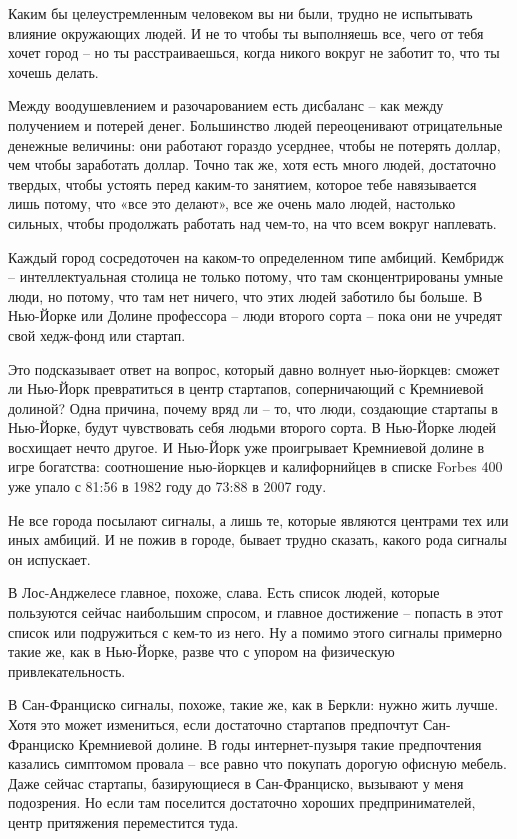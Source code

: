 \documentclass[ebook,12pt,oneside,openany]{memoir}
\begin{document}
Каким бы целеустремленным человеком вы ни были, трудно не испытывать
влияние окружающих людей. И не то чтобы ты выполняешь все, чего от
тебя хочет город – но ты расстраиваешься, когда никого вокруг не
заботит то, что ты хочешь делать.

Между воодушевлением и разочарованием есть дисбаланс – как между
получением и потерей денег. Большинство людей переоценивают
отрицательные денежные величины: они работают гораздо усерднее, чтобы
не потерять доллар, чем чтобы заработать доллар. Точно так же, хотя
есть много людей, достаточно твердых, чтобы устоять перед каким-то
занятием, которое тебе навязывается лишь потому, что «все это делают»,
все же очень мало людей, настолько сильных, чтобы продолжать работать
над чем-то, на что всем вокруг наплевать.

Каждый город сосредоточен на каком-то определенном типе амбиций.
Кембридж – интеллектуальная столица не только потому, что там
сконцентрированы умные люди, но потому, что там нет ничего, что этих
людей заботило бы больше. В Нью-Йорке или Долине профессора – люди
второго сорта – пока они не учредят свой хедж-фонд или стартап.

Это подсказывает ответ на вопрос, который давно волнует нью-йоркцев:
сможет ли Нью-Йорк превратиться в центр стартапов, соперничающий с
Кремниевой долиной? Одна причина, почему вряд ли – то, что люди,
создающие стартапы в Нью-Йорке, будут чувствовать себя людьми второго
сорта. В Нью-Йорке людей восхищает нечто другое. И Нью-Йорк уже
проигрывает Кремниевой долине в игре богатства: соотношение
нью-йоркцев и калифорнийцев в списке Forbes 400 уже упало с 81:56 в
1982 году до 73:88 в 2007 году.


Не все города посылают сигналы, а лишь те, которые являются центрами
тех или иных амбиций. И не пожив в городе, бывает трудно сказать,
какого рода сигналы он испускает.

В Лос-Анджелесе главное, похоже, слава. Есть список людей, которые
пользуются сейчас наибольшим спросом, и главное достижение – попасть в
этот список или подружиться с кем-то из него. Ну а помимо этого
сигналы примерно такие же, как в Нью-Йорке, разве что с упором на
физическую привлекательность.

В Сан-Франциско сигналы, похоже, такие же, как в Беркли: нужно жить
лучше. Хотя это может измениться, если достаточно стартапов предпочтут
Сан-Франциско Кремниевой долине. В годы интернет-пузыря такие
предпочтения казались симптомом провала – все равно что покупать
дорогую офисную мебель. Даже сейчас стартапы, базирующиеся в
Сан-Франциско, вызывают у меня подозрения. Но если там поселится
достаточно хороших предпринимателей, центр притяжения переместится
туда.
\end{document}
